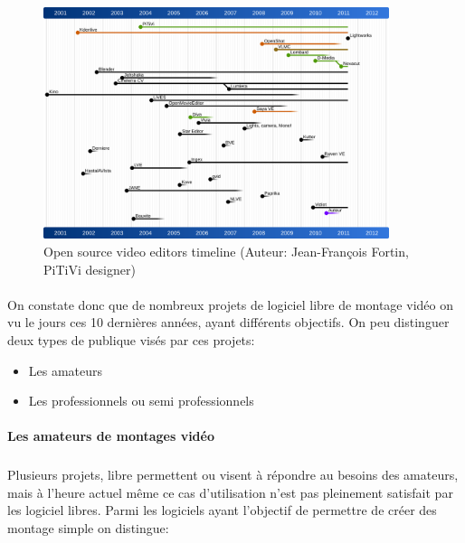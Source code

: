 \begin{figure} [h]
  \begin{center}
    \includegraphics[width=0.9\textwidth]{images/open-source-video-editor-timeline}
  \end{center} \caption{Open source video editors timeline (Auteur:
  Jean-François Fortin, PiTiVi designer)} \label{Yes}
\end{figure}

\paragraph{ }

On constate donc que de nombreux projets de logiciel libre de montage
vidéo on vu le jours ces 10 dernières années, ayant différents
objectifs.  On peu distinguer deux types de publique visés par ces
projets:

\begin {itemize}
  \item {Les amateurs}
  \item {Les professionnels ou semi professionnels}
\end {itemize}

\paragraph {Les amateurs de montages vidéo}

\subparagraph{}

Plusieurs projets, libre permettent ou visent à répondre au besoins
des amateurs, mais à l'heure actuel même ce cas d'utilisation n'est
pas pleinement satisfait par les logiciel libres. Parmi les logiciels
ayant l'objectif de permettre de créer des montage simple on distingue:

